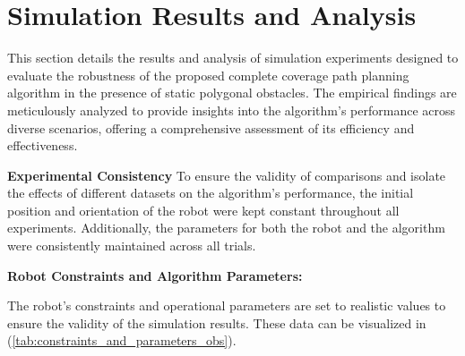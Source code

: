 \section{Simulation Results and Analysis}

This section details the results and analysis of simulation experiments designed to evaluate the robustness of the proposed complete coverage path planning algorithm in the presence of static polygonal obstacles. The empirical findings are meticulously analyzed to provide insights into the algorithm's performance across diverse scenarios, offering a comprehensive assessment of its efficiency and effectiveness.

\vspace{3mm}  

\textbf{Experimental Consistency}
To ensure the validity of comparisons and isolate the effects of different datasets on the algorithm's performance, the initial position and orientation of the robot were kept constant throughout all experiments. Additionally, the parameters for both the robot and the algorithm were consistently maintained across all trials.

\vspace{3mm}  

\textbf{Robot Constraints and Algorithm Parameters: } 


The robot's constraints and operational parameters are set to realistic values to ensure the validity of the simulation results. These data can be visualized in (\autoref{tab:constraints_and_parameters_obs}).

